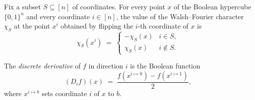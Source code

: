 \begin{lemma}
\label{BooleanAnalysis.chiS_flipBit}
\leanok
{}
Fix a subset $S\subseteq[n]$ of coordinates. For every point $x$ of the Boolean
hypercube $\{0,1\}^n$ and every coordinate $i\in[n]$, the value of the Walsh--Fourier
character $\chi_S$ at the point $x^i$ obtained by flipping the $i$-th coordinate of $x$
is
\[
  \chi_S(x^i) \;=\;
  \begin{cases} -\chi_S(x) & i\in S,\\[2pt] \chi_S(x) & i\notin S. \end{cases}
\]
\end{lemma}

\begin{definition}
\label{BooleanAnalysis.derivative}
\leanok
{}
The \emph{discrete derivative} of $f$ in direction $i$ is the Boolean function
\[
  (D_i f)(x) \;=\; \frac{f(x^{i\mapsto 0}) - f(x^{i\mapsto 1})}{2},
\]
where $x^{i\mapsto b}$ sets coordinate $i$ of $x$ to $b$.
\end{definition}

